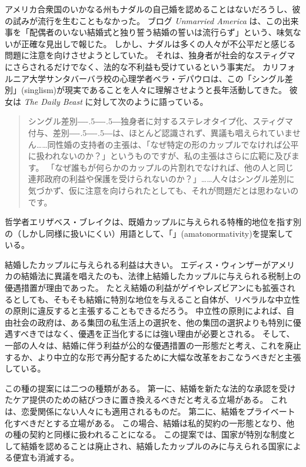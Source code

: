 \documentclass[paper=a4,book,openany]{jlreq}
\def\DDASH{―\kern-.5\zw―\kern-.5\zw―} %
\begin{document}
アメリカ合衆国のいかなる州もナダルの自己婚を認めることはないだろうし、彼の試みが流行を生むこともなかった。
ブログ \emph{Unmarried America} は、この出来事を「配偶者のいない結婚式と独り誓う結婚の誓いは流行らず」という、味気ないが正確な見出しで報じた\citep{coleman07:_spous_weddin_solo_vows_not_catch}。
しかし、ナダルは多くの人々が不公平だと感じる問題に注意を向けさせようとしていた。
それは、独身者が社会的なスティグマにさらされるだけでなく、法的な不利益も受けているという事実だ。
カリフォルニア大学サンタバーバラ校の心理学者ベラ・デパウロは、この「シングル差別」(singlism)が現実であることを人々に理解させようと長年活動してきた。
彼女は \emph{The Daily Beast} に対して次のように語っている。

\begin{quote}
  シングル差別{\DDASH}独身者に対するステレオタイプ化、スティグマ付与、差別{\DDASH}は、ほとんど認識されず、異議も唱えられていません……同性婚の支持者の主張は、「なぜ特定の形のカップルでなければ公平に扱われないのか？」というものですが、私の主張はさらに広範に及びます。
「なぜ誰もが何らかのカップルの片割れでなければ、他の人と同じ連邦政府の利益や保護を受けられないのか？」……人々はシングル差別に気づかず、仮に注意を向けられたとしても、それが問題だとは思わないのです。
\citep{kelly12:_singl_out}

\end{quote}

哲学者エリザベス・ブレイクは、既婚カップルに与えられる特権的地位を指す別の（しかし同様に扱いにくい）用語として、「」(amatonormativity)を提案している。

結婚したカップルに与えられる利益は大きい\citep[pp.380--381]{sunstein08:_privat_marriag}。
エディス・ウィンザーがアメリカの結婚法に異議を唱えたのも、法律上結婚したカップルに与えられる税制上の優遇措置が理由であった。
たとえ結婚の利益がゲイやレズビアンにも拡張されるとしても、そもそも結婚に特別な地位を与えること自体が、リベラルな中立性の原則に違反すると主張することもできるだろう。
中立性の原則によれば、自由社会の政府は、ある集団の私生活上の選択を、他の集団の選択よりも特別に優遇すべきではなく、優遇を正当化するには強い理由が必要とされる。
そして、一部の人々は、結婚に伴う利益が公的な優遇措置の一形態だと考え、これを廃止するか、より中立的な形で再分配するために大幅な改革をおこなうべきだと主張している。

この種の提案には二つの種類がある。
第一に、結婚を新たな法的な承認を受けたケア提供のための結びつきに置き換えるべきだと考える立場がある。
これは、恋愛関係にない人々にも適用されるものだ。
第二に、結婚をプライベート化すべきだとする立場がある。
この場合、結婚は私的契約の一形態となり、他の種の契約と同様に扱われることになる。
この提案では、国家が特別な制度として結婚を認めることは廃止され、結婚したカップルのみに与えられる国家による便宜も消滅する。
\end{document}
